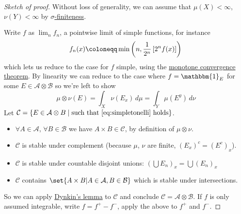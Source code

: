 \documentclass{article}
\newcommand{\1}[1]{\mathbbm{1}_{#1}}
\begin{document}
\begin{proof}[Sketch of proof]
    Without loss of generality, we can assume that $\mu(X) < \infty$, $\nu(Y) < \infty$ by \hyperlink{def:sigFinite}{$\sigma$-finiteness}.

    Write $f$ as $\lim_n f_n$, a pointwise limit of simple functions, for instance
    \begin{equation*}
        f_n(x) \coloneqq \min\left(n, \frac{1}{2^n} \left[2^n f(x)\right]\right) \\
    \end{equation*}
    which lets us reduce to the case for $f$ simple, using the \hyperlink{def:monConv}{monotone convergence theorem}.
    By linearity we can reduce to the case where $f = \1{E}$ for some $E \in \mathcal{A} \otimes \mathcal{B}$ so we're left to show
    \begin{equation*}
        \mu \otimes \nu(E) = \int_X \nu(E_x)\,d\mu = \int_Y \mu(E^y)\,d\nu \tag{$***$}\label{eq:simpletonelli}
    \end{equation*}
    Let $\mathcal{C} = \{E \in \mathcal{A} \otimes B \mid \text{such that } \eqref{eq:simpletonelli} \text{ holds} \}$.
    \begin{itemize}
        \item $\forall A \in \mathcal{A}$, $\forall B \in \mathcal{B}$ we have $A \times B \in \mathcal{C}$, by definition of $\mu \otimes \nu$.
        \item $\mathcal{C}$ is stable under complement (because $\mu$, $\nu$ are finite, $(E_x)^c = (E^c)_x$).
        \item $\mathcal{C}$ is stable under countable disjoint unions: $(\bigcup E_n)_x = \bigcup(E_n)_x$
        \item $\mathcal{C}$ contains $\set{A \times B | A \in \mathcal{A}, B \in \mathcal{B}}$ which is stable under intersections.
    \end{itemize}
    So we can apply \hyperlink{lem:dynkin}{Dynkin's lemma} to $\mathcal{C}$ and conclude $\mathcal{C} = \mathcal{A} \otimes \mathcal{B}$.
    If $f$ is only assumed integrable, write $f = f^+ - f^-$, apply the above to $f^+$ and $f^-$.
\end{proof}

\end{document}
